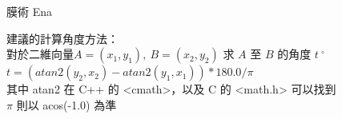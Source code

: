 \begin{problem}{膜術 Ena}
\Examples

\begin{example}
\end{example}

\Note

建議的計算角度方法： \\
對於二維向量$A=(x_1,y_1),\ B=(x_2,y_2)$ 求 $A$ 至 $B$ 的角度 $t \ ^{\circ}$ \\
$ t = (atan2(y_2,x_2) - atan2(y_1,x_1)) * 180.0 / \pi\ \ $\\
其中 atan2 在 C++ 的 <cmath>，以及 C 的 <math.h> 可以找到\\
$\pi$ 則以 acos(-1.0) 為準
\end{problem}
